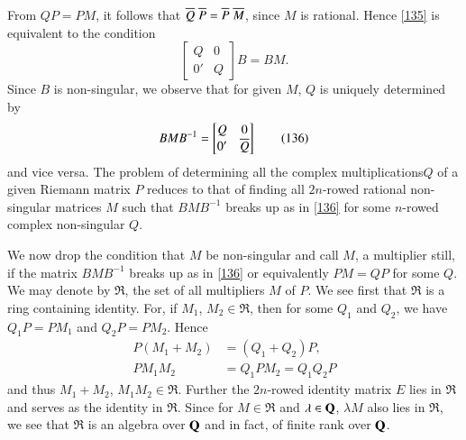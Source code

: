 From $QP=PM$, it follows that $\overline{Q} \; \overline{P} = \overline{P} \; \overline{M}$, since $M$
is rational. Hence \eqref{135} is equivalent to the condition
$$
\begin{bmatrix}
Q & 0\\
0' & Q
\end{bmatrix}
B=BM.
$$
Since $B$ is non-singular, we observe that for given $M$, $Q$ is
uniquely determined by
\begin{equation*}
BMB^{-1}=
\begin{bmatrix}
Q & 0\\
0' & \overline{Q}
\end{bmatrix}\tag{136}\label{136}
\end{equation*}
and vice versa. The problem of determining all the complex
multiplications\pageoriginale $Q$ of a given Riemann matrix $P$
reduces to that of finding all $2n$-rowed rational non-singular
matrices $M$ such that $BMB^{-1}$ breaks up as in \eqref{136} for some
$n$-rowed complex non-singular $Q$.

We now drop the condition that $M$ be non-singular and call $M$, a
multiplier still, if the matrix $BMB^{-1}$ breaks up as in \eqref{136}
or equivalently $PM=QP$ for some $Q$. We may denote by $\mathfrak{R}$,
the set of all multipliers $M$ of $P$. We see first that
$\mathfrak{R}$ is a ring containing identity. For, if $M_{1}$,
$M_{2}\in\mathfrak{R}$, then for some $Q_{1}$ and $Q_{2}$, we have
$Q_{1}P=PM_{1}$ and $Q_{2}P=PM_{2}$. Hence
\begin{align*}
P(M_{1}+M_{2}) &= (Q_{1}+Q_{2})P,\\
PM_{1}M_{2} &= Q_{1}PM_{2}=Q_{1}Q_{2}P
\end{align*}
and thus $M_{1}+M_{2}$, $M_{1}M_{2}\in\mathfrak{R}$. Further the
$2n$-rowed identity matrix $E$ lies in $\mathfrak{R}$ and serves as
the identity in $\mathfrak{R}$. Since for $M\in\mathfrak{R}$ and
$\lambda\in \mathbf{Q}$, $\lambda M$ also lies in $\mathfrak{R}$, we see that
$\mathfrak{R}$ is an algebra over $\mathbf{Q}$ and in fact, of finite rank
over $\mathbf{Q}$.

